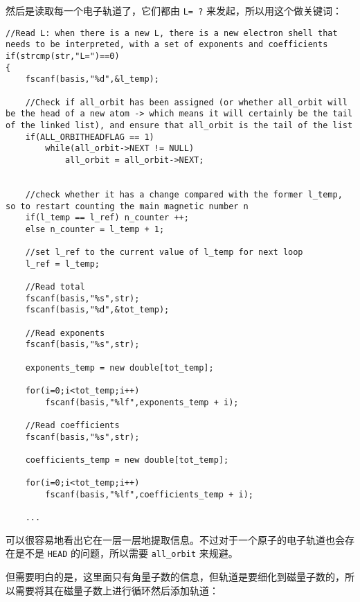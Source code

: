 \documentclass[12pt,a4paper,openany,twoside]{article}
\numberwithin{equation}{section}
\begin{document}
            然后是读取每一个电子轨道了，它们都由 \lstinline$L= ?$ 来发起，所以用这个做关键词：
            \begin{lstlisting}
//Read L: when there is a new L, there is a new electron shell that needs to be interpreted, with a set of exponents and coefficients
if(strcmp(str,"L=")==0)
{
    fscanf(basis,"%d",&l_temp);

    //Check if all_orbit has been assigned (or whether all_orbit will be the head of a new atom -> which means it will certainly be the tail of the linked list), and ensure that all_orbit is the tail of the list
    if(ALL_ORBITHEADFLAG == 1)
        while(all_orbit->NEXT != NULL)
            all_orbit = all_orbit->NEXT;


    //check whether it has a change compared with the former l_temp, so to restart counting the main magnetic number n
    if(l_temp == l_ref) n_counter ++;
    else n_counter = l_temp + 1;

    //set l_ref to the current value of l_temp for next loop
    l_ref = l_temp;

    //Read total
    fscanf(basis,"%s",str);
    fscanf(basis,"%d",&tot_temp);

    //Read exponents
    fscanf(basis,"%s",str);

    exponents_temp = new double[tot_temp];

    for(i=0;i<tot_temp;i++)
        fscanf(basis,"%lf",exponents_temp + i);

    //Read coefficients
    fscanf(basis,"%s",str);

    coefficients_temp = new double[tot_temp];

    for(i=0;i<tot_temp;i++)
        fscanf(basis,"%lf",coefficients_temp + i);

    ...
            \end{lstlisting}

            可以很容易地看出它在一层一层地提取信息。不过对于一个原子的电子轨道也会存在是不是 \lstinline$HEAD$ 的问题，所以需要 \lstinline$all_orbit$ 来规避。

            但需要明白的是，这里面只有角量子数的信息，但轨道是要细化到磁量子数的，所以需要将其在磁量子数上进行循环然后添加轨道：
\end{document}
